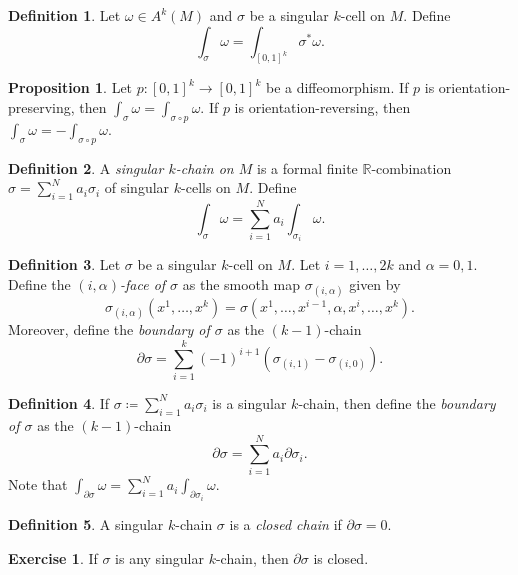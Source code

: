 \documentclass[10pt,letterpaper,cm]{nupset}
\theoremstyle{definition}
\newtheorem*{definition}{Definition}
\newtheorem{exercise}{Exercise}
\newtheorem{prop}{Proposition}
\newcommand{\R}{\mathbb R}
\newcommand{\1}{\mathbf{1}}
\newcommand{\0}{\vec 0}
\begin{document}
\begin{definition}
Let $\omega \in A^k(M)$ and $\sigma$ be a singular $k$-cell on $M$. Define $$ \int_{\sigma} \omega = \int_{[0,1]^k}\sigma^{\ast}\omega  .$$
\end{definition}

\begin{prop}
Let $p: [0,1]^k \to [0,1]^k$ be a diffeomorphism. If $p$ is orientation-preserving, then $\int_{\sigma} \omega = \int_{\sigma \circ p} \omega$. If $p$ is orientation-reversing, then $\int_{\sigma} \omega = -\int_{\sigma \circ p} \omega.$
\end{prop}

\begin{definition}
A \textit{singular $k$-chain on $M$} is a formal finite  $\R$-combination $\sigma = \sum_{i=1}^Na_i\sigma_i$ of singular $k$-cells on $M$. Define $$ \int_{\sigma} \omega= \sum_{i=1}^N a_i\int_{\sigma_i}\omega .$$
\end{definition}

\begin{definition}
Let $\sigma$ be a singular $k$-cell on $M$. Let $i=1, \ldots, 2k$ and $\alpha =0,1$. Define the \textit{$(i, \alpha)$-face of $\sigma$} as the smooth map $\sigma_{(i, \alpha)}$ given by $$\sigma_{(i, \alpha)}(x^1, \ldots, x^k) = \sigma(x^1,\ldots, x^{i-1}, \alpha, x^{i}, \ldots, x^k).$$ Moreover, define the \textit{boundary of $\sigma$} as the $(k-1)$-chain $$  \partial{\sigma} = \sum_{i=1}^k(-1)^{i+1}(\sigma_{(i,1)}-\sigma_{(i,0)}) .$$
\end{definition}

\begin{definition}
If $\sigma\coloneqq  \sum_{i=1}^Na_i\sigma_i$ is a singular $k$-chain, then define the \textit{boundary of $\sigma$} as the $(k-1)$-chain $$\partial{\sigma} = \sum_{i=1}^N a_i \partial{\sigma_i}   .$$ Note that $\int_{\partial{\sigma}}\omega = \sum_{i=1}^N a_i \int_{\partial{\sigma_i}}\omega$.
\end{definition}

\begin{definition}
A singular $k$-chain $\sigma$ is a \textit{closed chain} if $\partial{\sigma}=0$.
\end{definition}

\begin{exercise}
If $\sigma$ is any singular $k$-chain, then ${\partial{\sigma}}$ is closed.
\end{exercise}
\end{document}
